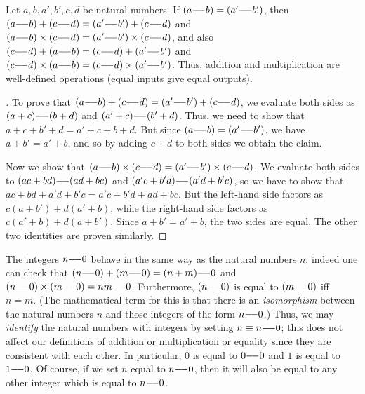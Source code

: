 \begin{lem}\label{i:4.1.3}
  Let \(a, b, a', b', c, d\) be natural numbers.
  If \((a {-}\!{-} b) = (a' {-}\!{-} b')\), then \((a {-}\!{-} b) + (c {-}\!{-} d) = (a' {-}\!{-} b') + (c {-}\!{-} d)\) and \((a {-}\!{-} b) \times (c {-}\!{-} d) = (a' {-}\!{-} b') \times (c {-}\!{-} d)\), and also \((c {-}\!{-} d) + (a {-}\!{-} b) = (c {-}\!{-} d) + (a' {-}\!{-} b')\) and \((c {-}\!{-} d) \times (a {-}\!{-} b) = (c {-}\!{-} d) \times (a' {-}\!{-} b')\).
  Thus, addition and multiplication are well-defined operations (equal inputs give equal outputs).
\end{lem}

\begin{proof}[]
  To prove that \((a {-}\!{-} b) + (c {-}\!{-} d) = (a' {-}\!{-} b') + (c {-}\!{-} d)\), we evaluate both sides as \((a + c) {-}\!{-} (b + d)\) and \((a' + c) {-}\!{-} (b' + d)\).
  Thus, we need to show that \(a + c + b' + d = a' + c + b + d\).
  But since \((a {-}\!{-} b) = (a' {-}\!{-} b')\), we have \(a + b' = a' + b\), and so by adding \(c + d\) to both sides we obtain the claim.

  Now we show that \((a {-}\!{-} b) \times (c {-}\!{-} d) = (a' {-}\!{-} b') \times (c {-}\!{-} d)\).
  We evaluate both sides to \((ac + bd) {-}\!{-} (ad + bc)\) and \((a'c + b'd) {-}\!{-} (a'd + b'c)\), so we have to show that \(ac + bd + a'd + b'c = a'c + b'd + ad + bc\).
  But the left-hand side factors as \(c(a + b') + d(a' + b)\), while the right-hand side factors as \(c(a' + b) + d(a + b')\).
  Since \(a + b' = a' + b\), the two sides are equal.
  The other two identities are proven similarly.
\end{proof}

\begin{ac}\label{i:ac:4.1.2}
  The integers \(n {-}\!{-} 0\) behave in the same way as the natural numbers \(n\);
  indeed one can check that \((n {-}\!{-} 0) + (m {-}\!{-} 0) = (n + m) {-}\!{-} 0\) and \((n {-}\!{-} 0) \times (m {-}\!{-} 0) = nm {-}\!{-} 0\).
  Furthermore, \((n {-}\!{-} 0)\) is equal to \((m {-}\!{-} 0)\) iff \(n = m\).
  (The mathematical term for this is that there is an \emph{isomorphism} between the natural numbers \(n\) and those integers of the form \(n {-}\!{-} 0\).)
  Thus, we may \emph{identify} the natural numbers with integers by setting \(n \equiv n {-}\!{-} 0\);
  this does not affect our definitions of addition or multiplication or equality since they are consistent with each other.
  In particular, \(0\) is equal to \(0 {-}\!{-} 0\) and \(1\) is equal to \(1 {-}\!{-} 0\).
  Of course, if we set \(n\) equal to \(n {-}\!{-} 0\), then it will also be equal to any other integer which is equal to \(n {-}\!{-} 0\).
\end{ac}

